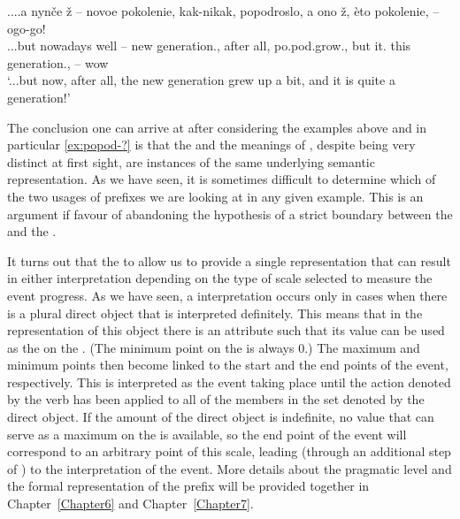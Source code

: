 \exg.\label{ex:popod-?}...a nyn\v{c}e \v{z} – novoe pokolenie, kak-nikak, popodroslo, a ono \v{z}, \`{e}to pokolenie, -- ogo-go!\\
...but nowadays well -- new generation., {after all}, po.pod.grow., but it. {} this generation., -- wow
\\
\trans `...but now, after all, the new generation grew up a bit, and it is quite a generation!'
 
The conclusion one can arrive at after considering the examples above and in particular \ref{ex:popod-?} is that the  and the  meanings of , despite being very distinct at first sight, are instances of the same underlying semantic representation. As we have seen, it is sometimes difficult to determine which of the two usages of prefixes we are looking at in any given example. This is an argument if favour of abandoning the hypothesis of a strict boundary between the   and the  .

It turns out that the  to  allow us to provide a single representation that can result in either interpretation depending on the type of scale selected to measure the event progress. As we have seen, a  interpretation occurs only in cases when there is a plural direct object that is interpreted definitely. This means that in the representation of this object there is an attribute such that its value can be used as the  on the . (The minimum point on the  is always 0.) The maximum and minimum points then become linked to the start and the end points of the event, respectively. This is interpreted as the event taking place until the action denoted by the verb has been applied to all of the members in the set denoted by the direct object. If the amount of the direct object is indefinite, no value that can serve as a maximum on the  is available, so the end point of the event will correspond to an arbitrary point of this scale, leading (through an additional step of ) to the  interpretation of the event. More details about the pragmatic level and the formal representation of the prefix will be provided together in Chapter~\ref{Chapter6} and Chapter~\ref{Chapter7}.

